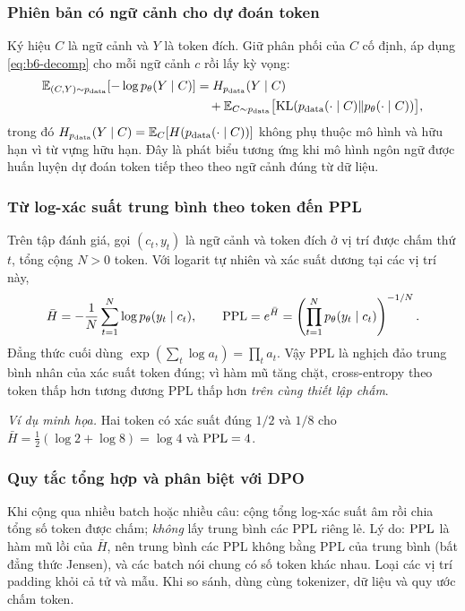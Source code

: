 \subsubsection{Phiên bản có ngữ cảnh cho dự đoán token}

Ký hiệu $C$ là ngữ cảnh và $Y$ là token đích. Giữ phân phối của $C$ cố định, áp
dụng \eqref{eq:b6-decomp} cho mỗi ngữ cảnh $c$ rồi lấy kỳ vọng:
\begin{align}
  \mathbb{E}_{(C,Y)\sim p_{\mathrm{data}}}[-\log p_\theta(Y\mid C)]
   &= H_{p_{\mathrm{data}}}(Y\mid C)\notag\\
   &\quad+\mathbb{E}_{C\sim p_{\mathrm{data}}}\bigl[\operatorname{KL}(p_{\mathrm{data}}(\cdot\mid C)\|p_\theta(\cdot\mid C))\bigr],
  \label{eq:b6-ctx}
\end{align}
trong đó $H_{p_{\mathrm{data}}}(Y\mid C)=\mathbb{E}_{C}[H(p_{\mathrm{data}}(\cdot\mid C))]$ không phụ thuộc mô
hình và hữu hạn vì từ vựng hữu hạn. Đây là phát biểu tương ứng khi mô hình ngôn ngữ
được huấn luyện dự đoán token tiếp theo theo ngữ cảnh đúng từ dữ liệu.

\subsubsection{Từ log-xác suất trung bình theo token đến PPL}

Trên tập đánh giá, gọi $(c_t,y_t)$ là ngữ cảnh và token đích ở vị trí được chấm thứ
$t$, tổng cộng $N>0$ token. Với logarit tự nhiên và xác suất dương tại các vị trí
này,
\begin{equation}
  \bar H=-\frac{1}{N}\sum_{t=1}^{N}\log p_\theta(y_t\mid c_t),\qquad
  \mathrm{PPL}=e^{\bar H}
    =\left(\prod_{t=1}^{N} p_\theta(y_t\mid c_t)\right)^{-1/N}.
  \label{eq:b6-ppl}
\end{equation}
Đẳng thức cuối dùng $\exp(\sum_t\log a_t)=\prod_t a_t$. Vậy PPL là nghịch đảo
trung bình nhân của xác suất token đúng; vì hàm mũ tăng chặt, cross-entropy theo
token thấp hơn tương đương PPL thấp hơn \emph{trên cùng thiết lập chấm}.

\emph{Ví dụ minh họa.} Hai token có xác suất đúng $1/2$ và $1/8$ cho
$\bar H=\tfrac12(\log 2+\log 8)=\log 4$ và $\mathrm{PPL}=4$.

\subsubsection{Quy tắc tổng hợp và phân biệt với DPO}
\label{sec:b6-agg}

Khi cộng qua nhiều batch hoặc nhiều câu: cộng tổng log-xác suất âm rồi chia tổng số
token được chấm; \emph{không} lấy trung bình các PPL riêng lẻ. Lý do: $\mathrm{PPL}$ là hàm
mũ lồi của $\bar H$, nên trung bình các PPL không bằng PPL của trung bình (bất đẳng
thức Jensen), và các batch nói chung có số token khác nhau. Loại các vị trí padding
khỏi cả tử và mẫu. Khi so sánh, dùng cùng tokenizer, dữ liệu và quy ước chấm token.

